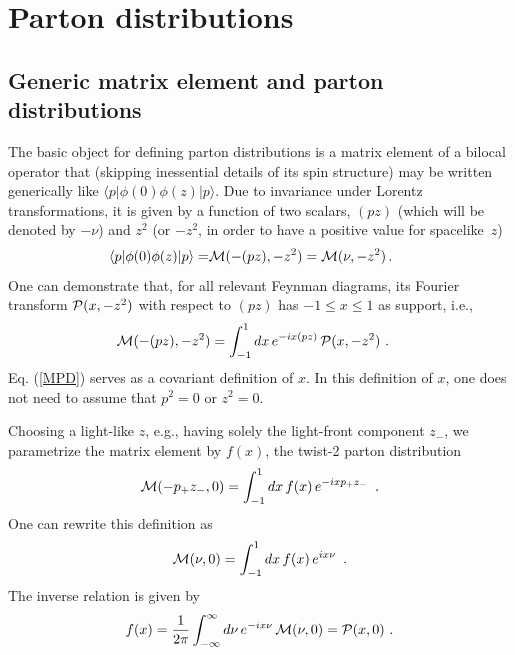 \section{Parton distributions}

\subsection{Generic matrix element  and parton distributions}

 The basic object for defining parton distributions is a matrix element
 of a bilocal operator that  (skipping inessential details of  its
 spin structure)   may be written   generically  like
 $\langle  p | \phi (0)  \phi(z)  | p \rangle $.
 Due to invariance under Lorentz transformations, it is given by a function of two scalars,  $(pz)$
 (which will  be denoted by $-\nu$)  and   $z^2$
 (or $-z^2$, in order to have a positive value  for \mbox{spacelike $z$)}
  \begin{align}
  \langle p |   \phi(0) \phi (z)|p \rangle %
=  & {\cal M} (-(pz), -z^2)  =  {\cal M} (\nu, -z^2)
\,  .
 \
 \label{lorentz}
\end{align}
 One can demonstrate \cite{Radyushkin:2016hsy,Radyushkin:1983wh}    that, for all relevant Feynman diagrams,
 its  Fourier transform  ${\cal P} (x, -z^2)$ with respect to $(pz)$
 has $-1 \leq x \leq 1$ as support, i.e.,
   \begin{align}
 {\cal M} (-(pz), -z^2)
&   =
 \int_{-1}^1 dx
 \, e^{-i x (pz) } \,  {\cal P} (x, -z^2)  \   .
  \label{MPD}
\end{align}
  Eq. (\ref{MPD}) serves as a covariant definition of $x$.
   In this  definition of $x$, one does not need to assume that
$p^2=0$ or $z^2=0$.

Choosing a light-like  $z$, e.g.,
having  solely the light-front component $z_-$,  we
parametrize the matrix element  by $f(x)$, the twist-2 parton distribution
  \begin{align}
  {\cal M} (-p_+ z_- , 0)  =
   \int_{-1}^1 dx \, f(x) \,
e^{-ixp_+ z_-} \,  \   .
 \label{twist2par0}
\end{align}
One can  rewrite this definition as
  \begin{align}
  {\cal M} (\nu, 0)  =
   \int_{-1}^1 dx \, f(x) \,
e^{ix\nu} \,  \  .
 \label{twist2par1}
\end{align}
The inverse relation is given by
\begin{align}
 f  (x)  =\frac{1}{2 \pi}  \int_{-\infty}^{\infty}  d\nu \, e^{-i x \nu}  \, {\cal M}(\nu , 0)    = {\cal P} (x, 0)
  \  .
\label{fxMnu}
\end{align}

